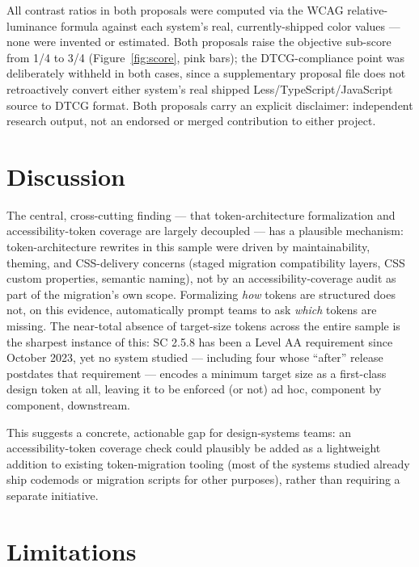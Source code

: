 \documentclass[11pt]{article}
\begin{document}
All contrast ratios in both proposals were computed via the WCAG relative-luminance formula against each system's real, currently-shipped color values --- none were invented or estimated. Both proposals raise the objective sub-score from 1/4 to 3/4 (Figure~\ref{fig:score}, pink bars); the DTCG-compliance point was deliberately withheld in both cases, since a supplementary proposal file does not retroactively convert either system's real shipped Less/TypeScript/JavaScript source to DTCG format. Both proposals carry an explicit disclaimer: independent research output, not an endorsed or merged contribution to either project.

\section{Discussion}

The central, cross-cutting finding --- that token-architecture formalization and accessibility-token coverage are largely decoupled --- has a plausible mechanism: token-architecture rewrites in this sample were driven by maintainability, theming, and CSS-delivery concerns (staged migration compatibility layers, CSS custom properties, semantic naming), not by an accessibility-coverage audit as part of the migration's own scope. Formalizing \emph{how} tokens are structured does not, on this evidence, automatically prompt teams to ask \emph{which} tokens are missing. The near-total absence of target-size tokens across the entire sample is the sharpest instance of this: SC 2.5.8 has been a Level AA requirement since October 2023, yet no system studied --- including four whose ``after'' release postdates that requirement --- encodes a minimum target size as a first-class design token at all, leaving it to be enforced (or not) ad hoc, component by component, downstream.

This suggests a concrete, actionable gap for design-systems teams: an accessibility-token coverage check could plausibly be added as a lightweight addition to existing token-migration tooling (most of the systems studied already ship codemods or migration scripts for other purposes), rather than requiring a separate initiative.

\section{Limitations}
\end{document}
